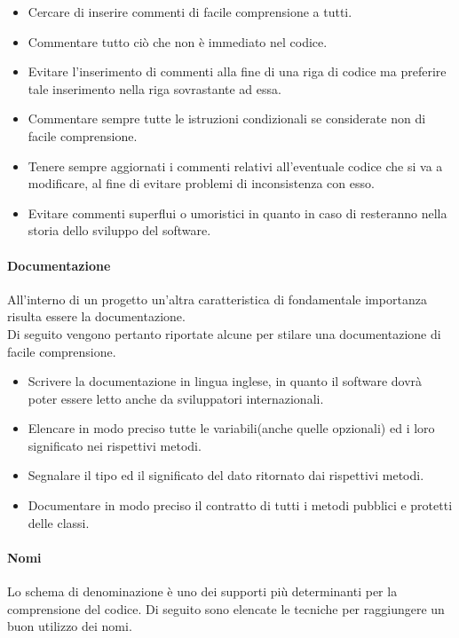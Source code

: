 \begin{itemize}
\item Cercare di inserire commenti di facile comprensione a tutti.

\item Commentare tutto ciò che non è immediato nel codice.

\item Evitare l'inserimento di commenti alla fine di una riga di codice ma preferire tale inserimento nella riga sovrastante ad essa.

\item Commentare sempre tutte le istruzioni condizionali se considerate non di facile comprensione.

\item Tenere sempre aggiornati i commenti relativi all'eventuale codice che si va a modificare, al fine di evitare problemi di inconsistenza con esso.

\item Evitare commenti superflui o umoristici in quanto in caso di  resteranno nella storia dello sviluppo del software.
\end{itemize}

\paragraph{Documentazione}
All'interno di un progetto  un'altra caratteristica di fondamentale importanza risulta essere la documentazione. \\
Di seguito vengono pertanto riportate alcune  per stilare una documentazione di facile comprensione.

\begin{itemize}
\item Scrivere la documentazione in lingua inglese, in quanto il software dovrà poter essere letto anche da sviluppatori internazionali.
\item Elencare in modo preciso tutte le variabili(anche quelle opzionali) ed i loro significato nei rispettivi metodi.
\item Segnalare il tipo ed il significato del dato ritornato dai rispettivi metodi.
\item Documentare in modo preciso il contratto di tutti i metodi pubblici e protetti delle classi.
\end{itemize}

\paragraph{Nomi}
Lo schema di denominazione è uno dei supporti più determinanti per la comprensione del codice.
Di seguito sono elencate le tecniche per raggiungere un buon utilizzo dei nomi.

